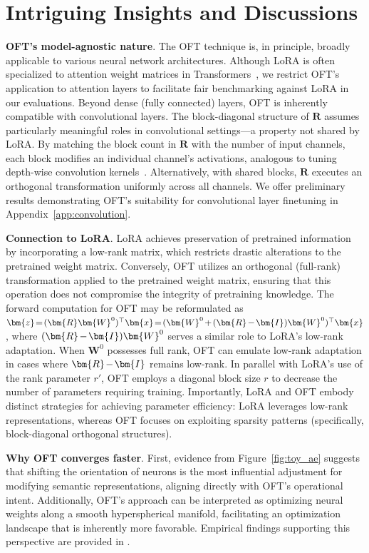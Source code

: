 \section{Intriguing Insights and Discussions}

\textbf{OFT’s model-agnostic nature}. The OFT technique is, in principle, broadly applicable to various neural network architectures. Although LoRA is often specialized to attention weight matrices in Transformers~\cite{hulora2022}, we restrict OFT's application to attention layers to facilitate fair benchmarking against LoRA in our evaluations. Beyond dense (fully connected) layers, OFT is inherently compatible with convolutional layers. The block-diagonal structure of $\bm{R}$ assumes particularly meaningful roles in convolutional settings—a property not shared by LoRA. By matching the block count in $\bm{R}$ with the number of input channels, each block modifies an individual channel's activations, analogous to tuning depth-wise convolution kernels~\cite{chollet2017xception}. Alternatively, with shared blocks, $\bm{R}$ executes an orthogonal transformation uniformly across all channels. We offer preliminary results demonstrating OFT’s suitability for convolutional layer finetuning in Appendix~\ref{app:convolution}.

\textbf{Connection to LoRA}. LoRA achieves preservation of pretrained information by incorporating a low-rank matrix, which restricts drastic alterations to the pretrained weight matrix. Conversely, OFT utilizes an orthogonal (full-rank) transformation applied to the pretrained weight matrix, ensuring that this operation does not compromise the integrity of pretraining knowledge. The forward computation for OFT may be reformulated as $\thickmuskip=2mu \medmuskip=2mu \bm{z}=(\bm{R}\bm{W}^0)^\top\bm{x}=(\bm{W}^0+(\bm{R}-\bm{I})\bm{W}^0)^\top\bm{x}$, where $\thickmuskip=2mu \medmuskip=2mu (\bm{R}-\bm{I})\bm{W}^0$ serves a similar role to LoRA's low-rank adaptation. When $\bm{W}^0$ possesses full rank, OFT can emulate low-rank adaptation in cases where $\thickmuskip=2mu \medmuskip=2mu \bm{R}-\bm{I}$ remains low-rank. In parallel with LoRA’s use of the rank parameter $r'$, OFT employs a diagonal block size $r$ to decrease the number of parameters requiring training. Importantly, LoRA and OFT embody distinct strategies for achieving parameter efficiency: LoRA leverages low-rank representations, whereas OFT focuses on exploiting sparsity patterns (specifically, block-diagonal orthogonal structures).

\textbf{Why OFT converges faster}. First, evidence from Figure~\ref{fig:toy_ae} suggests that shifting the orientation of neurons is the most influential adjustment for modifying semantic representations, aligning directly with OFT’s operational intent. Additionally, OFT’s approach can be interpreted as optimizing neural weights along a smooth hyperspherical manifold, facilitating an optimization landscape that is inherently more favorable. Empirical findings supporting this perspective are provided in \cite{liu2021orthogonal}.

